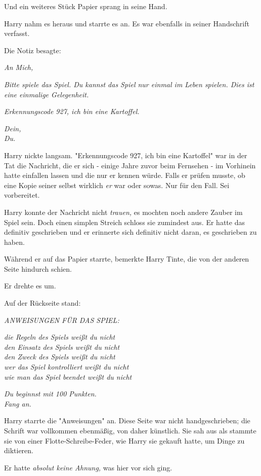 {Und ein weiteres Stück Papier sprang in seine Hand.

Harry nahm es heraus und starrte es an. Es war ebenfalls in seiner Handschrift verfasst.

Die Notiz besagte:

\emph{An Mich,}

\emph{Bitte spiele das Spiel. Du kannst das Spiel nur einmal im Leben spielen. Dies ist eine einmalige Gelegenheit.}

\emph{Erkennungscode 927, ich bin eine Kartoffel.}

\emph{\emph{Dein,\\ Du.}}

Harry nickte langsam. "Erkennungscode 927, ich bin eine Kartoffel" war in der Tat die Nachricht, die er sich - einige Jahre zuvor beim Fernsehen - im Vorhinein hatte einfallen lassen und die nur er kennen würde. Falls er prüfen musste, ob eine Kopie seiner selbst wirklich \emph{er} war oder sowas. Nur für den Fall. Sei vorbereitet.

Harry konnte der Nachricht nicht \emph{trauen,} es mochten noch andere Zauber im Spiel sein. Doch einen simplen Streich schloss sie zumindest aus. Er hatte das definitiv geschrieben und er erinnerte sich definitiv nicht daran, es geschrieben zu haben.

Während er auf das Papier starrte, bemerkte Harry Tinte, die von der anderen Seite hindurch schien.

Er drehte es um.

Auf der Rückseite stand:

\emph{ANWEISUNGEN FÜR DAS SPIEL:}

\emph{die Regeln des Spiels weißt du nicht\\ den Einsatz des Spiels weißt du nicht\\ den Zweck des Spiels weißt du nicht\\ wer das Spiel kontrolliert weißt du nicht\\ wie man das Spiel beendet weißt du nicht}

\emph{Du beginnst mit 100 Punkten.\\ Fang an.}

Harry starrte die "Anweisungen" an. Diese Seite war nicht handgeschrieben; die Schrift war vollkommen ebenmäßig, von daher künstlich. Sie sah aus als stammte sie von einer Flotte-Schreibe-Feder, wie Harry sie gekauft hatte, um Dinge zu diktieren.

Er hatte \emph{absolut keine Ahnung,} was hier vor sich ging.

}
